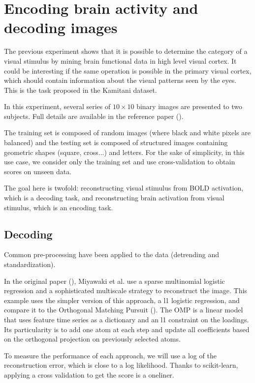 \documentclass{frontiersSCNS} %
\newcounter{x}
\newcounter{y}
\newcounter{z}
\begin{document}
\section{Encoding brain activity and decoding images}
\label{kamitani}

The previous experiment shows that it is possible to determine the category of a
visual stimulus by mining brain functional data in high level visual cortex. It
could be interesting if the same operation is possible in the primary visual
cortex, which should contain information about the visual patterns seen by the
eyes. This is the task proposed in the Kamitani dataset.

In this experiment, several series of $10\times10$ binary images are presented
to two subjects. Full details are available in the reference paper
(\cite{miyawaki2008}).

The training set is composed of random images (where black and white pixels
are balanced) and the testing set is composed of structured images containing
geometric shapes (square, cross...) and letters. For the sake of simplicity, in
this use case, we consider only the training set and use cross-validation to
obtain scores on unseen data.

The goal here is twofold: reconstructing visual stimulus from BOLD activation,
which is a decoding task, and reconstructing brain activation from visual
stimulus, which is an encoding task.

\subsection{Decoding}

Common pre-processing have been applied to the data (detrending and
standardization).

In the original paper (\cite{miyawaki2008}), Miyawaki et al. use a sparse multinomial
logistic regression and a sophisticated multiscale strategy to reconstruct the image.
This example uses the simpler version of this approach, a l1 logistic
regression, and compare it to the Orthogonal
Matching Pursuit (\cite{mallat1993}). The OMP is a linear model that uses
feature time series as a dictionary and an l1 constraint on the loadings. Its
particularity is to add one atom at each step and update all coefficients
based on the orthogonal projection on previously selected atoms.

To measure the performance of each approach, we will use a log of the
reconstruction error, which is close to a log likelihood. Thanks to
scikit-learn, applying a cross validation to get the score is a oneliner.
\end{document}
